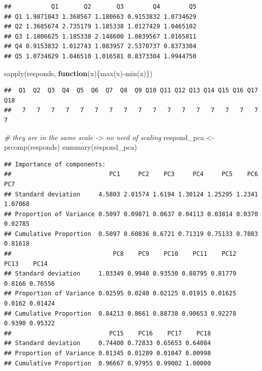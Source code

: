 \documentclass[
]{article}
\newenvironment{Shaded}{\begin{snugshade}}{\end{snugshade}}
\newcommand{\CommentTok}[1]{\textcolor[rgb]{0.56,0.35,0.01}{\textit{#1}}}
\newcommand{\ControlFlowTok}[1]{\textcolor[rgb]{0.13,0.29,0.53}{\textbf{#1}}}
\newcommand{\FunctionTok}[1]{\textcolor[rgb]{0.00,0.00,0.00}{#1}}
\newcommand{\NormalTok}[1]{#1}
\newcommand{\OtherTok}[1]{\textcolor[rgb]{0.56,0.35,0.01}{#1}}
\newcommand{\SpecialCharTok}[1]{\textcolor[rgb]{0.00,0.00,0.00}{#1}}
\begin{document}
\begin{verbatim}
##           Q1       Q2       Q3        Q4        Q5
## Q1 1.9871043 1.368567 1.180663 0.9153832 1.0734629
## Q2 1.3685674 2.735179 1.185338 1.0127429 1.0465102
## Q3 1.1806625 1.185338 2.148600 1.0839567 1.0165811
## Q4 0.9153832 1.012743 1.083957 2.5370737 0.8373304
## Q5 1.0734629 1.046510 1.016581 0.8373304 1.9944750
\end{verbatim}

\begin{Shaded}
\begin{Highlighting}[]
\FunctionTok{sapply}\NormalTok{(responds, }\ControlFlowTok{function}\NormalTok{(x)\{}\FunctionTok{max}\NormalTok{(x)}\SpecialCharTok{{-}}\FunctionTok{min}\NormalTok{(x)\})}
\end{Highlighting}
\end{Shaded}

\begin{verbatim}
##  Q1  Q2  Q3  Q4  Q5  Q6  Q7  Q8  Q9 Q10 Q11 Q12 Q13 Q14 Q15 Q16 Q17 Q18 
##   7   7   7   7   7   7   7   7   7   7   7   7   7   7   7   7   7   7
\end{verbatim}

\begin{Shaded}
\begin{Highlighting}[]
\CommentTok{\# they are in the same scale {-}\textgreater{} no need of scaling}
\NormalTok{respond\_pca }\OtherTok{\textless{}{-}} \FunctionTok{prcomp}\NormalTok{(responds)}
\FunctionTok{summary}\NormalTok{(respond\_pca)}
\end{Highlighting}
\end{Shaded}

\begin{verbatim}
## Importance of components:
##                           PC1     PC2    PC3     PC4     PC5    PC6     PC7
## Standard deviation     4.5803 2.01574 1.6194 1.30124 1.25295 1.2341 1.07068
## Proportion of Variance 0.5097 0.09871 0.0637 0.04113 0.03814 0.0370 0.02785
## Cumulative Proportion  0.5097 0.60836 0.6721 0.71319 0.75133 0.7883 0.81618
##                            PC8    PC9    PC10    PC11    PC12   PC13    PC14
## Standard deviation     1.03349 0.9940 0.93530 0.88795 0.81779 0.8166 0.76556
## Proportion of Variance 0.02595 0.0240 0.02125 0.01915 0.01625 0.0162 0.01424
## Cumulative Proportion  0.84213 0.8661 0.88738 0.90653 0.92278 0.9390 0.95322
##                           PC15    PC16    PC17    PC18
## Standard deviation     0.74400 0.72833 0.65653 0.64084
## Proportion of Variance 0.01345 0.01289 0.01047 0.00998
## Cumulative Proportion  0.96667 0.97955 0.99002 1.00000
\end{verbatim}
\end{document}
